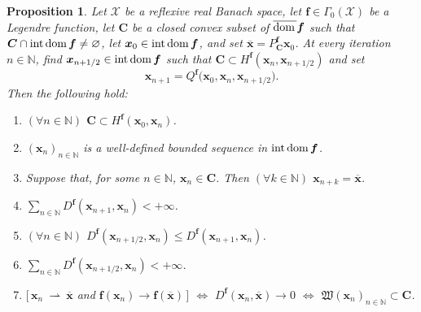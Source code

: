 \documentclass[a4paper,11pt,fleqn]{article}
\renewcommand{\leq}{\ensuremath{\leqslant}}
\newcommand{\WC}{\ensuremath{{\mathfrak W}}}
\newcommand{\XXX}{\ensuremath{\boldsymbol{\mathcal X}}}
\newcommand{\emp}{\ensuremath{{\varnothing}}}
\newcommand{\NN}{\ensuremath{\mathbb N}}
\newcommand{\weakly}{\ensuremath{\:\rightharpoonup\:}}
\newcommand{\dom}{\ensuremath{\text{\rm dom}\,}}
\newcommand{\inte}{\ensuremath{\text{\rm int}\,}}
\newcommand{\intdom}{\ensuremath{\text{\rm int\,dom}\,}}
\newtheorem{proposition}[theorem]{Proposition}
\theoremstyle{plain}{\theorembodyfont{\rmfamily}%
\newtheorem{conjecture}[theorem]{Conjecture}}
\theoremstyle{plain}{\theorembodyfont{\rmfamily}%
\newtheorem{example}[theorem]{Example}}
\theoremstyle{plain}{\theorembodyfont{\rmfamily}%
\newtheorem{remark}[theorem]{Remark}}
\theoremstyle{plain}{\theorembodyfont{\rmfamily}%
\newtheorem{algorithm}[theorem]{Algorithm}}
\theoremstyle{plain}{\theorembodyfont{\rmfamily}%
\newtheorem{condition}[theorem]{Condition}}
\theoremstyle{plain}{\theorembodyfont{\rmfamily}%
\newtheorem{definition}[theorem]{Definition}}
\theoremstyle{plain}{\theorembodyfont{\rmfamily}
\newtheorem{problem}[theorem]{Problem}}
\theoremstyle{plain}{\theorembodyfont{\rmfamily}
\newtheorem{notation}[theorem]{Notation}}
\numberwithin{equation}{section}
\begin{document}
\begin{proposition}
\label{p:2}
Let $\XXX$ be a reflexive real Banach space, let 
$\boldsymbol{f}\in\Gamma_0(\XXX)$ be a Legendre 
function, let $\boldsymbol{C}$ be a closed convex subset 
of $\overline{\dom}\boldsymbol{f}$ such that 
$\boldsymbol{C}\cap\intdom\boldsymbol{f}\neq\emp$,
let $\boldsymbol{x}_0\in\intdom\boldsymbol{f}$, and set 
$\overline{\boldsymbol{x}}=P_{\boldsymbol{C}}^{\boldsymbol{f}}
\boldsymbol{x}_0$. 
At every iteration $n\in\NN$, find 
$\boldsymbol{x}_{n+1/2}\in\inte\dom\boldsymbol{f}$ such that 
$\boldsymbol{C}\subset H^{\boldsymbol{f}}
(\boldsymbol{x}_n,\boldsymbol{x}_{n+1/2})$ and set
\begin{equation}
\label{e:haugazeau}
\boldsymbol{x}_{n+1}=Q^{\boldsymbol{f}}
\big(\boldsymbol{x}_0,\boldsymbol{x}_n,\boldsymbol{x}_{n+1/2}\big).
\end{equation}
Then the following hold:
\begin{enumerate}
\item
\label{p:2i-}
$(\forall n\in\NN)$ $\boldsymbol{C}\subset H^{\boldsymbol{f}}
(\boldsymbol{x}_0,\boldsymbol{x}_n)$.
\item
\label{p:2i}
$(\boldsymbol{x}_n)_{n\in\NN}$ is a well-defined bounded sequence 
in $\intdom\boldsymbol{f}$.
\item
\label{p:2ii+} 
Suppose that, for some $n\in\NN$, 
$\boldsymbol{x}_n\in\boldsymbol{C}$. Then $(\forall k\in\NN)$ 
$\boldsymbol{x}_{n+k}=\overline{\boldsymbol{x}}$.
\item
\label{p:2ii} 
$\sum_{n\in\NN}D^{\boldsymbol{f}}(\boldsymbol{x}_{n+1},
\boldsymbol{x}_n)<+\infty$.
\item
\label{p:2iii-} 
$(\forall n\in\NN)$ $D^{\boldsymbol{f}}
(\boldsymbol{x}_{n+1/2},\boldsymbol{x}_n)\leq 
D^{\boldsymbol{f}}(\boldsymbol{x}_{n+1},\boldsymbol{x}_n)$.
\item
\label{p:2iii} 
$\sum_{n\in\NN}D^{\boldsymbol{f}}(\boldsymbol{x}_{n+1/2},
\boldsymbol{x}_n)<+\infty$.
\item
\label{p:2iv} 
$[\,\boldsymbol{x}_n\weakly\overline{\boldsymbol{x}}$ and 
$\boldsymbol{f}(\boldsymbol{x}_n)\to\boldsymbol{f}
(\overline{\boldsymbol{x}})\,]$ 
$\Leftrightarrow$ $D^{\boldsymbol{f}}(\boldsymbol{x}_n,
\overline{\boldsymbol{x}})\to 0$ 
$\Leftrightarrow$
$\WC(\boldsymbol{x}_n)_{n\in\NN}\subset\boldsymbol{C}$. 
\end{enumerate}
\end{proposition}
\end{document}
